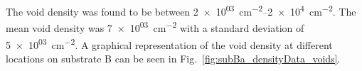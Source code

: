 The void density was found to be between \SIrange{2e+03}{2e+4}{\centi\metre^{-2}}. The mean void density was \SI{7e+03}{\centi\metre^{-2}} with a standard deviation of \SI{5e+03}{\centi\metre^{-2}}. A graphical representation of the void density at different locations on substrate B can be seen in Fig.~\ref{fig:subBa_densityData_voids}.

\begin{comment}
The void density was found to be between \SI{1e+02}{\centi\metre^{-2}} and \SI{2e+3}{\centi\metre^{-2}}. The mean void density was \SI{4e+02}{\centi\metre^{-2}} with a standard deviation of \SI{3e+02}{\centi\metre^{-2}}. A graphical representation of the void density at different locations on substrate B can be seen in Fig.~\ref{fig:subBa_densityData_largevoid}.

\begin{figure}[htbp]
    \centering
        \mySubfigure{0.403\linewidth}{subBa_densityData_largevoids.png}[fig:subBa_densityData_largevoid_map]
        \hfill
        \mySubfigure{0.577\linewidth}{C-3895-23A_A01_x060.png}[fig:subBa_densityData_largevoid_sem]
    \caption[Map of the large void density on the as-received substrate B.]{\subref{fig:subBa_densityData_void_map} A map of the large void density at 36 different locations on the as-received $\SI{30}{\milli\metre}\times\SI{30}{\milli\metre}$ substrate B. The large void density was observed to vary between \SI{1e+02}{\centi\metre^{-2}} and \SI{2e+3}{\centi\metre^{-2}}. \subref{fig:subBa_densityData_void_sem} An image from the upper right corner of the grid where the large void density is highest.}
    \label{fig:subBa_densityData_void}
\end{figure}

The microvoid density was found to be between \SI{2e+03}{\centi\metre^{-2}} and \SI{2e+4}{\centi\metre^{-2}}. The mean microvoid density was \SI{6e+03}{\centi\metre^{-2}} with a standard deviation of \SI{5e+03}{\centi\metre^{-2}}. A graphical representation of the microvoid density at different locations on substrate B can be seen in Fig.~\ref{fig:subBa_densityData_microvoid}.

\begin{figure}[htbp]
    \centering
        \mySubfigure{0.403\linewidth}{subBa_densityData_microvoids.png}[fig:subBa_densityData_microvoid_map]
        \hfill
        \mySubfigure{0.577\linewidth}{C-3895-23A_A11_x500.png}[fig:subBa_densityData_microvoid_sem]
    \caption[Map of the microvoid density on the as-received substrate B.]{\subref{fig:subBa_densityData_microvoid_map} A map of the microvoid density at 36 different locations on the as-received $\SI{30}{\milli\metre}\times\SI{30}{\milli\metre}$ substrate B. The microvoid density was observed to vary between \SI{2e+03}{\centi\metre^{-2}} and \SI{2e+4}{\centi\metre^{-2}}. \subref{fig:subBa_densityData_microvoid_sem} An image from the upper right corner of the grid where the microvoid density is highest.}
    \label{fig:subBa_densityData_microvoid}
\end{figure}
\end{comment}

